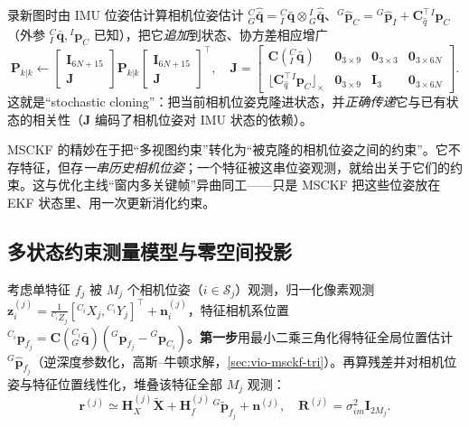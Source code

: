录新图时由 IMU 位姿估计算相机位姿估计 ${}^C_G\hat{\bar{\mathbf{q}}}={}^C_I\bar{\mathbf{q}}\otimes{}^I_G\hat{\bar{\mathbf{q}}}$、${}^G\hat{\mathbf{p}}_C={}^G\hat{\mathbf{p}}_I+\mathbf{C}_{\hat q}^\top{}^I\mathbf{p}_C$（外参 ${}^C_I\bar{\mathbf{q}},{}^I\mathbf{p}_C$ 已知），把它\emph{追加}到状态、协方差相应增广
\begin{equation}
  \mathbf{P}_{k|k}\leftarrow\begin{bmatrix}\mathbf{I}_{6N+15}\\ \mathbf{J}\end{bmatrix}\mathbf{P}_{k|k}\begin{bmatrix}\mathbf{I}_{6N+15}\\ \mathbf{J}\end{bmatrix}^\top,
  \quad
  \mathbf{J}=\begin{bmatrix}\mathbf{C}({}^C_I\bar{\mathbf{q}})&\mathbf{0}_{3\times9}&\mathbf{0}_{3\times3}&\mathbf{0}_{3\times6N}\\ \lfloor\mathbf{C}_{\hat q}^\top{}^I\mathbf{p}_C\rfloor_\times&\mathbf{0}_{3\times9}&\mathbf{I}_3&\mathbf{0}_{3\times6N}\end{bmatrix}.
  \label{eq:vio-msckf-clone}
\end{equation}
这就是“stochastic cloning”：把当前相机位姿克隆进状态，并\emph{正确传递}它与已有状态的相关性（$\mathbf{J}$ 编码了相机位姿对 IMU 状态的依赖）。

\begin{insight}
MSCKF 的精妙在于把“多视图约束”转化为“被克隆的相机位姿之间的约束”。它不存特征，但存\emph{一串历史相机位姿}；一个特征被这串位姿观测，就给出关于它们的约束。这与优化主线“窗内多关键帧”异曲同工——只是 MSCKF 把这些位姿放在 EKF 状态里、用一次更新消化约束。
\end{insight}

\subsection{多状态约束测量模型与零空间投影}
\label{sec:vio-msckf-meas}

考虑单特征 $f_j$ 被 $M_j$ 个相机位姿（$i\in\mathcal{S}_j$）观测，归一化像素观测 $\mathbf{z}_i^{(j)}=\tfrac{1}{{}^{C_i}Z_j}[{}^{C_i}X_j,{}^{C_i}Y_j]^\top+\mathbf{n}_i^{(j)}$，特征相机系位置 ${}^{C_i}\mathbf{p}_{f_j}=\mathbf{C}({}^{C_i}_G\bar{\mathbf{q}})({}^G\mathbf{p}_{f_j}-{}^G\mathbf{p}_{C_i})$。\textbf{第一步}用最小二乘三角化得特征全局位置估计 ${}^G\hat{\mathbf{p}}_{f_j}$（逆深度参数化，高斯--牛顿求解，\cref{sec:vio-msckf-tri}）。再算残差并对相机位姿与特征位置线性化，堆叠该特征全部 $M_j$ 观测：
\begin{equation}
  \mathbf{r}^{(j)}\simeq\mathbf{H}_X^{(j)}\tilde{\mathbf{X}}+\mathbf{H}_f^{(j)}\,{}^G\tilde{\mathbf{p}}_{f_j}+\mathbf{n}^{(j)},
  \quad \mathbf{R}^{(j)}=\sigma_{im}^2\mathbf{I}_{2M_j}.
  \label{eq:vio-msckf-stack}
\end{equation}

